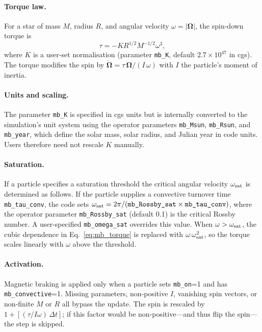 \documentclass[11pt]{article}
\begin{document}
\paragraph{Torque law.} For a star of mass $M$, radius $R$, and angular
velocity $\omega = |\bm\Omega|$, the spin‑down torque is
\begin{equation}
\tau = -K R^{1/2} M^{-1/2} \omega^3,
\label{eq:mb_torque}
\end{equation}
where $K$ is a user‑set normalisation (parameter \texttt{mb\_K}, default
$2.7\times10^{47}$ in cgs).  The torque modifies the spin by
$\dot{\bm\Omega}=\tau\,\bm\Omega/(I\,\omega)$ with $I$ the particle's moment
of inertia.

\paragraph{Units and scaling.} The parameter \texttt{mb\_K} is specified in cgs
units but is internally converted to the simulation's unit system using the
operator parameters \texttt{mb\_Msun}, \texttt{mb\_Rsun}, and \texttt{mb\_year},
which define the solar mass, solar radius, and Julian year in code units.
Users therefore need not rescale $K$ manually.

\paragraph{Saturation.} If a particle specifies a saturation threshold
the critical angular velocity $\omega_{\rm sat}$ is determined as follows.
If the particle supplies a convective turnover time \texttt{mb\_tau\_conv}, the
code sets $\omega_{\rm sat}=2\pi/(\texttt{mb\_Rossby\_sat}\times\texttt{mb\_tau\_conv})$,
where the operator parameter \texttt{mb\_Rossby\_sat} (default 0.1) is the
critical Rossby number.  A user-specified \texttt{mb\_omega\_sat} overrides this
value.  When $\omega>\omega_{\rm sat}$, the cubic dependence in
Eq.~\eqref{eq:mb_torque} is replaced with $\omega\,\omega_{\rm sat}^2$, so the
torque scales linearly with $\omega$ above the threshold.

\paragraph{Activation.} Magnetic braking is applied only when a particle sets
\texttt{mb\_on}=1 and has \texttt{mb\_convective}=1. Missing parameters,
non‑positive $I$, vanishing spin vectors, or non‑finite $M$ or $R$ all
bypass the update.  The spin is rescaled by $1+[(\tau/I\omega)\,\Delta t]$;
if this factor would be non‑positive—and thus flip the spin—the step is
skipped.
\end{document}
